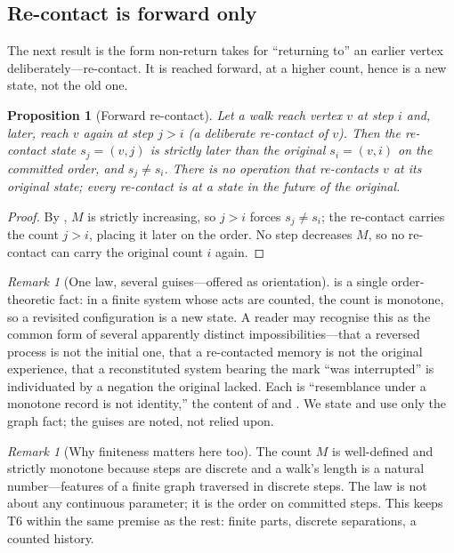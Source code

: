 \documentclass[11pt,a4paper]{article}
\theoremstyle{thmstyle}
\newtheorem{proposition}[theorem]{Proposition}
\theoremstyle{definition}
\theoremstyle{remark}
\newtheorem{remark}[theorem]{Remark}
\newcommand{\rec}{M}                      %
\begin{document}
\subsection{Re-contact is forward only}

The next result is the form non-return takes for ``returning to'' an earlier
vertex deliberately---re-contact. It is reached forward, at a higher count, hence
is a new state, not the old one.

\begin{proposition}[Forward re-contact]
\label{prop:recontact}
Let a walk reach vertex $v$ at step $i$ and, later, reach $v$ again at step
$j>i$ \textup{(}a deliberate re-contact of $v$\textup{)}. Then the re-contact
state $s_j=(v,j)$ is strictly later than the original $s_i=(v,i)$ on the
committed order, and $s_j\neq s_i$. There is no operation that re-contacts $v$ at
its original state; every re-contact is at a state in the future of the original.
\end{proposition}

\begin{proof}
By , $\rec$ is strictly increasing, so $j>i$ forces
$s_j\neq s_i$; the re-contact carries the count $j>i$, placing it later on the
order. No step decreases $\rec$, so no re-contact can carry the original count
$i$ again.
\end{proof}

\begin{remark}[One law, several guises---offered as orientation]
\label{rem:onelaw}
 is a single order-theoretic fact: in a finite system whose
acts are counted, the count is monotone, so a revisited configuration is a new
state. A reader may recognise this as the common form of several apparently
distinct impossibilities---that a reversed process is not the initial one, that a
re-contacted memory is not the original experience, that a reconstituted system
bearing the mark ``was interrupted'' is individuated by a negation the original
lacked. Each is ``resemblance under a monotone record is not identity,'' the
content of  and . We state and use only
the graph fact; the guises are noted, not relied upon.
\end{remark}

\begin{remark}[Why finiteness matters here too]
\label{rem:nonreturn-finite}
The count $\rec$ is well-defined and strictly monotone because steps are
discrete and a walk's length is a natural number---features of a finite graph
traversed in discrete steps. The law is not about any continuous parameter; it is
the order on committed steps. This keeps T6 within the same premise as the rest:
finite parts, discrete separations, a counted history.
\end{remark}
\end{document}
